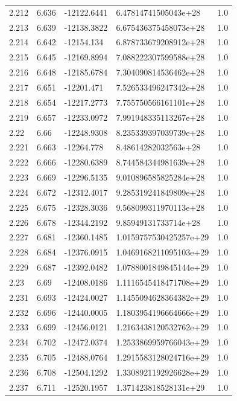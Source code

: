 \begin{tabular}{lllll}
2.212 & 6.636 & -12122.6441 & 6.47814741505043e+28 & 1.0 \\
2.213 & 6.639 & -12138.3822 & 6.675436375458073e+28 & 1.0 \\
2.214 & 6.642 & -12154.134 & 6.878733679208912e+28 & 1.0 \\
2.215 & 6.645 & -12169.8994 & 7.088222307599588e+28 & 1.0 \\
2.216 & 6.648 & -12185.6784 & 7.304090814536462e+28 & 1.0 \\
2.217 & 6.651 & -12201.471 & 7.526533496247342e+28 & 1.0 \\
2.218 & 6.654 & -12217.2773 & 7.755750566161101e+28 & 1.0 \\
2.219 & 6.657 & -12233.0972 & 7.991948335113267e+28 & 1.0 \\
2.22 & 6.66 & -12248.9308 & 8.235339397039739e+28 & 1.0 \\
2.221 & 6.663 & -12264.778 & 8.48614282032563e+28 & 1.0 \\
2.222 & 6.666 & -12280.6389 & 8.744584344981639e+28 & 1.0 \\
2.223 & 6.669 & -12296.5135 & 9.010896585825284e+28 & 1.0 \\
2.224 & 6.672 & -12312.4017 & 9.285319241849809e+28 & 1.0 \\
2.225 & 6.675 & -12328.3036 & 9.568099311970113e+28 & 1.0 \\
2.226 & 6.678 & -12344.2192 & 9.85949131733714e+28 & 1.0 \\
2.227 & 6.681 & -12360.1485 & 1.0159757530425257e+29 & 1.0 \\
2.228 & 6.684 & -12376.0915 & 1.0469168211095103e+29 & 1.0 \\
2.229 & 6.687 & -12392.0482 & 1.0788001849845144e+29 & 1.0 \\
2.23 & 6.69 & -12408.0186 & 1.1116545418471708e+29 & 1.0 \\
2.231 & 6.693 & -12424.0027 & 1.1455094628364382e+29 & 1.0 \\
2.232 & 6.696 & -12440.0005 & 1.1803954196664666e+29 & 1.0 \\
2.233 & 6.699 & -12456.0121 & 1.2163438120532762e+29 & 1.0 \\
2.234 & 6.702 & -12472.0374 & 1.2533869959766043e+29 & 1.0 \\
2.235 & 6.705 & -12488.0764 & 1.2915583128024716e+29 & 1.0 \\
2.236 & 6.708 & -12504.1292 & 1.3308921192926628e+29 & 1.0 \\
2.237 & 6.711 & -12520.1957 & 1.371423818528131e+29 & 1.0 \\

\end{tabular}
